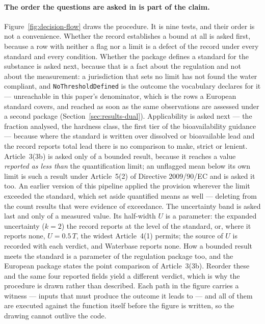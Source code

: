 \paragraph{The order the questions are asked in is part of the claim.}
Figure~\ref{fig:decision-flow} draws the procedure. It is nine tests, and their
order is not a convenience. Whether the record establishes a bound at all is
asked first, because a row with neither a flag nor a limit is a defect of the
record under every standard and every condition. Whether the package defines a
standard for the substance is asked next, because that is a fact about the
regulation and not about the measurement: a jurisdiction that sets no limit has
not found the water compliant, and \texttt{NoThresholdDefined} is the outcome
the vocabulary declares for it --- unreachable in this paper's denominator,
which is the rows a European standard covers, and reached as soon as the same
observations are assessed under a second package
(Section~\ref{sec:results-dual}). Applicability is asked next ---
the fraction analysed, the hardness class, the first tier of the bioavailability
guidance~\cite{eu2019gd38} --- because where the standard is written over
dissolved or bioavailable lead and the record reports total lead there is no
comparison to make, strict or lenient. Article~3(3b) is asked only of a bounded
result, because it reaches a value \emph{reported as less than} the quantification
limit; an unflagged mean below its own limit is such a result under Article~5(2)
of Directive 2009/90/EC and is asked it too. An earlier version of this pipeline
applied the provision wherever the limit exceeded the standard, which set aside
quantified means as well --- deleting from the count results that were evidence
of exceedance. The uncertainty band is asked last and only of a measured value.
Its half-width $U$ is a parameter: the expanded uncertainty ($k=2$) the record
reports at the level of the standard, or, where it reports none, $U=0.5\,T$, the
widest Article~4(1) permits; the source of $U$ is recorded with each verdict, and
Waterbase reports none. How a bounded result meets the standard is a parameter of
the regulation package too, and the European package states the point comparison
of Article~3(3b). Reorder these and the same four reported fields yield a different
verdict, which is why the procedure is drawn rather than described. Each path in
the figure carries a witness --- inputs that must produce the outcome it leads
to --- and all of them are executed against the function itself before the
figure is written, so the drawing
cannot outlive the code.

